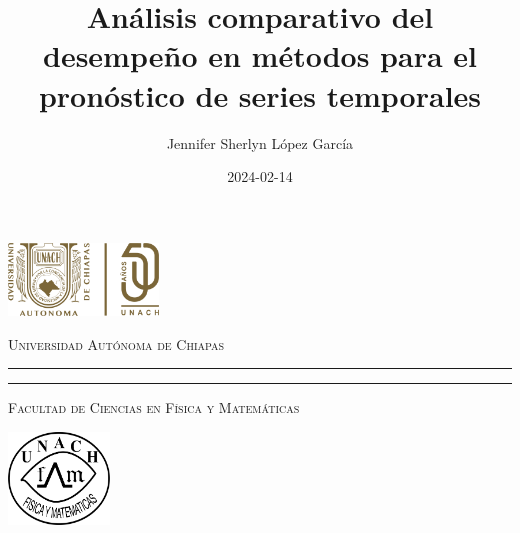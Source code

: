 \documentclass[
  us-letterpaper,
]{scrreprt}
\title{Análisis comparativo del desempeño en métodos para el pronóstico
de series temporales}
\author{Jennifer Sherlyn López García}
\date{2024-02-14}
\theoremstyle{plain}
\theoremstyle{definition}
\theoremstyle{plain}
\theoremstyle{definition}
\theoremstyle{remark}
\begin{document}
\begin{titlepage}
\hspace{-1.7cm} %
\begin{minipage}[t][0.03\textheight][c]{0.22\textwidth}
        \includegraphics[width=4.0cm]{LOGO50.png}
\end{minipage}\hspace{0.9cm}
\begin{minipage}[t][0.03\textheight][c]{0.69\textwidth}
\begin{center}
                \textsc{\huge Universidad Autónoma de Chiapas}\\[0.3cm]
                \hrule height 2.5pt
                \vspace{0.2cm}
                \hrule height1pt
                \vspace{0.3cm}
                \textsc{\Large Facultad de Ciencias en Física y Matemáticas}
\end{center}
\end{minipage}\hspace{0.2cm}
\begin{minipage}[t][0.03\textheight][c]{0.2\textwidth}
		\includegraphics[width=2.7cm]{logofcfm.png}
\end{minipage}\\
\begin{minipage}[t][0.93\textheight][c]{0.06\textwidth}
\vspace{60pt}
    \begin{center}
        \vrule width1pt height18cm
        \vspace{5mm}
        \vrule width2.5pt height18cm
        \vspace{5mm}
        \vrule width1pt height18cm
   \end{center}
\end{minipage}\hspace{1.3cm} %
\begin{minipage}[t][0.95\textheight][c]{0.76\textwidth}


\end{minipage}
\end{titlepage}
\end{document}
